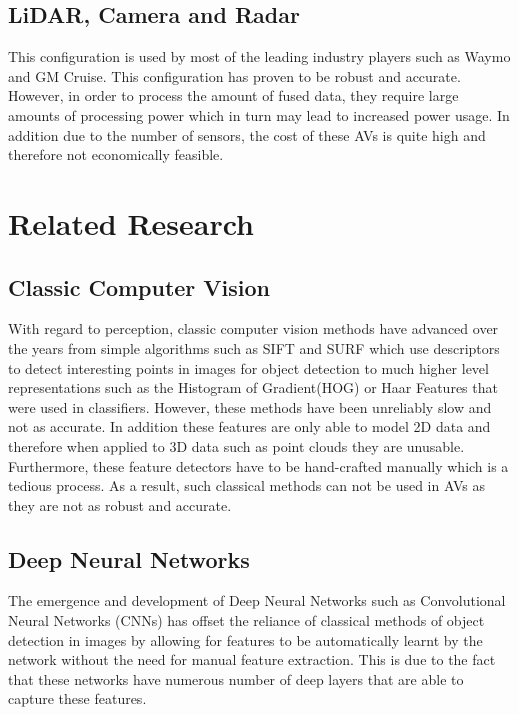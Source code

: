 \subsection{LiDAR, Camera and Radar}
This configuration is used by most of the leading industry players such as Waymo and GM Cruise. This configuration has proven to be robust and accurate.
 However, in order to process the amount of fused data, they require large amounts of processing power which in turn may lead to increased power usage. In addition due to the number of sensors, the cost of these AVs is quite high and therefore not economically feasible. 


\section{Related Research} 
\subsection{Classic Computer Vision}
With regard to perception, classic computer vision methods have advanced over the years from simple algorithms such as SIFT\cite{lowe1999object} and SURF\cite{bay2006surf} which use descriptors to detect interesting points in images for object detection to much higher level representations such as the Histogram of Gradient(HOG)\cite{dalal2005histograms} or Haar Features\cite{viola2001rapid}  that were used in classifiers.  However, these methods have been unreliably slow and not as accurate. In addition these features are only able to model 2D data and therefore when applied to 3D data such as point clouds they are unusable. Furthermore, these feature detectors have to be hand-crafted manually which is a tedious process. As a result,  such classical methods can not be used in AVs as they are not as robust and accurate.  


\subsection{Deep Neural Networks}

The emergence and development of Deep Neural Networks such as Convolutional Neural Networks (CNNs)\cite{lawrence1997face} has offset the reliance of classical methods of object detection in images by allowing for features to be automatically learnt by the network without the need for manual feature extraction. This is due to the fact that these networks have numerous number of deep layers that are able to capture these features.  


